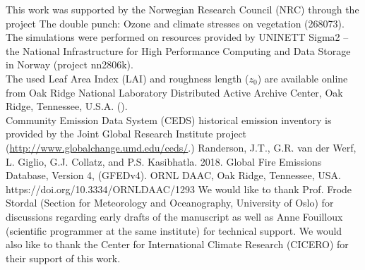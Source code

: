 \documentclass[gmd, manuscript]{copernicus}
\begin{document}
\begin{acknowledgements}
  This work was supported by the Norwegian Research Council (NRC) through the project The double punch: Ozone and climate stresses on vegetation (268073).\\
  The simulations were performed on resources provided by UNINETT Sigma2 -- the National Infrastructure for High Performance Computing and Data Storage in Norway (project nn2806k).\\
  The used Leaf Area Index (LAI) and roughness length ($z_0$) are available online from Oak Ridge National Laboratory Distributed Active Archive Center, Oak Ridge, Tennessee, U.S.A. ().\\
  Community Emission Data System (CEDS) historical emission inventory is provided by the Joint Global Research Institute project (\url{http://www.globalchange.umd.edu/ceds/}.)
  Randerson, J.T., G.R. van der Werf, L. Giglio, G.J. Collatz, and P.S. Kasibhatla. 2018. Global Fire Emissions Database, Version 4, (GFEDv4). ORNL DAAC, Oak Ridge, Tennessee, USA. https://doi.org/10.3334/ORNLDAAC/1293
  We would like to thank Prof. Frode Stordal (Section for Meteorology and Oceanography, University of Oslo) for discussions regarding early drafts of the manuscript as well as Anne Fouilloux (scientific programmer at the same institute) for technical support.
  We would also like to thank the Center for International Climate Research (CICERO) for their support of this work.
\end{acknowledgements}










\end{document}
